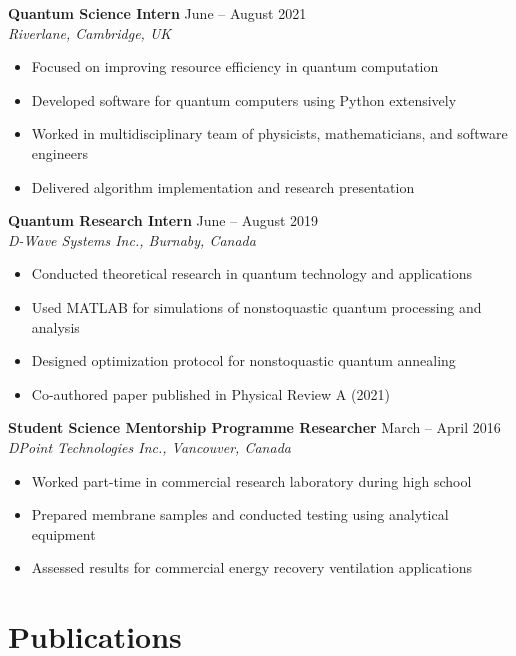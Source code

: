 \documentclass[11pt,a4paper]{article}
\newcommand{\cventry}[4]{%
    \noindent\textbf{#1} \hfill #2\\
    \textit{#3} \hfill #4\\[0.1em]
}
\begin{document}
\cventry{Quantum Science Intern}{June -- August 2021}{Riverlane, Cambridge, UK}{}
\begin{itemize}
    \item Focused on improving resource efficiency in quantum computation
    \item Developed software for quantum computers using Python extensively
    \item Worked in multidisciplinary team of physicists, mathematicians, and software engineers
    \item Delivered algorithm implementation and research presentation
\end{itemize}

\cventry{Quantum Research Intern}{June -- August 2019}{D-Wave Systems Inc., Burnaby, Canada}{}
\begin{itemize}
    \item Conducted theoretical research in quantum technology and applications
    \item Used MATLAB for simulations of nonstoquastic quantum processing and analysis
    \item Designed optimization protocol for nonstoquastic quantum annealing
    \item Co-authored paper published in Physical Review A (2021)
\end{itemize}

\cventry{Student Science Mentorship Programme Researcher}{March -- April 2016}{DPoint Technologies Inc., Vancouver, Canada}{}
\begin{itemize}
    \item Worked part-time in commercial research laboratory during high school
    \item Prepared membrane samples and conducted testing using analytical equipment
    \item Assessed results for commercial energy recovery ventilation applications
\end{itemize}

\section*{Publications}
\end{document}
